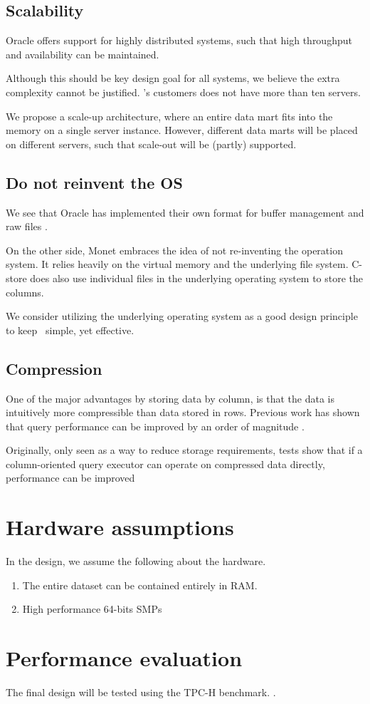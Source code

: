 \subsection{Scalability}
\label{sub:Scalability}
Oracle offers support for highly distributed systems, such that high throughput and availability can be maintained.

Although this should be key design goal for all systems, we believe the extra complexity cannot be justified. \genus 's customers does not have more than ten servers.

We propose a scale-up architecture, where an entire data mart fits into the memory on a single server instance. However, different data marts will be placed on different servers, such that scale-out will be (partly) supported.

\subsection{Do not reinvent the OS}
\label{sub:Do not reinvent the OS}
We see that Oracle has implemented their own format for buffer management and raw files .

On the other side, Monet embraces the idea of not re-inventing the operation system. It relies heavily on the virtual memory and the underlying file system. C-store does also use individual files in the underlying operating system to store the columns.

We consider utilizing the underlying operating system as a good design principle to keep \projectName~simple, yet effective.

\subsection{Compression}
\label{sub:Compression}
One of the major advantages by storing data by column, is that the data is intuitively more compressible than data stored in rows. Previous work has shown that query performance can be improved by an order of magnitude \cite{Abadi2006-bf}.

Originally, only seen as a way to reduce storage requirements, tests show that if a column-oriented query executor can operate on compressed data directly, performance can be improved \cite{Abadi2008-dd}


\section{Hardware assumptions}
In the design, we assume the following about the hardware.
\begin{enumerate}
  \item The entire dataset can be contained entirely in RAM.
  \item High performance 64-bits SMPs
\end{enumerate}

\section{Performance evaluation}
\label{sec:Performance evaluation}
The final design will be tested using the TPC-H benchmark. .
